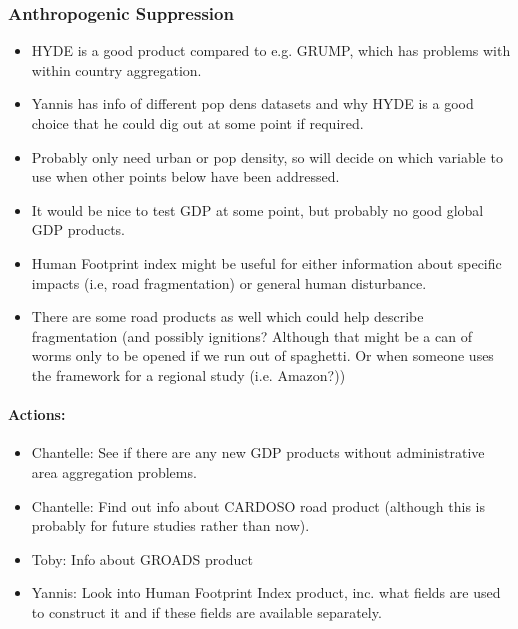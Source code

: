 \subsubsection{Anthropogenic Suppression}

\begin{itemize}
\itemsep1pt\parskip0pt
\item
  HYDE is a good product compared to e.g. GRUMP, which has problems with within country aggregation.
\item
  Yannis has info of different pop dens datasets and why HYDE is a good choice that he could dig out at some point if required.
\item
  Probably only need urban or pop density, so will decide on which variable to use when other points below have been addressed.
\item
  It would be nice to test GDP at some point, but probably no good global GDP products.
\item
  Human Footprint index might be useful for either information about specific impacts (i.e, road fragmentation) or general human disturbance.
\item
  There are some road products as well which could help describe fragmentation (and possibly ignitions? Although that might be a can of worms only to be opened if we run out of spaghetti. Or when someone uses the framework for a regional study (i.e. Amazon?))

\end{itemize}

\paragraph{Actions:}

\begin{itemize}
\itemsep1pt\parskip0pt
\item
  Chantelle: See if there are any new GDP products without administrative area aggregation problems.
\item
  Chantelle: Find out info about CARDOSO road product (although this is probably for future studies rather than now).
\item
  Toby: Info about GROADS product
\item
  Yannis: Look into Human Footprint Index product, inc. what fields are used to construct it and if these fields are available separately.
\end{itemize}

\hfill \break

